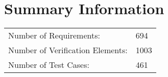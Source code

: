 \newpage
\section{Summary Information}
\begin{longtable}{ll}
\toprule
Number of Requirements: & 694 \\
Number of Verification Elements: & 1003 \\
Number of Test Cases: & 461 \\
\bottomrule
\end{longtable}
